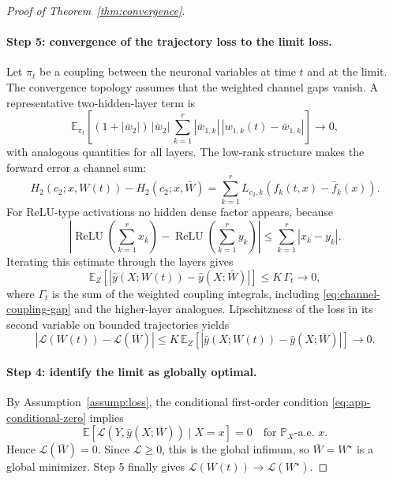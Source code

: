 \documentclass{article}
\newcommand{\E}{\mathbb{E}}
\newcommand{\Pp}{\mathbb{P}}
\newcommand{\calL}{\mathcal{L}}
\newcommand{\scrL}{\mathcal{L}}
\begin{document}
\begin{proof}[Proof of Theorem~\ref{thm:convergence}]
\paragraph{Step 5: convergence of the trajectory loss to the limit loss.}
Let $\pi_t$ be a coupling between the neuronal variables at time $t$ and at the limit. The convergence topology assumes that the weighted channel gaps vanish. A representative two-hidden-layer term is
\begin{equation}
\E_{\pi_t}\!\left[
(1+|\bar w_2|)\,|\bar w_2|\,
\sum_{k=1}^{r}|\bar w_{1,k}|\,|w_{1,k}(t)-\bar w_{1,k}|
\right]\longrightarrow0,
\label{eq:channel-coupling-gap}
\end{equation}
with analogous quantities for all layers. The low-rank structure makes the forward error a channel sum:
\begin{equation}
H_2(c_2;x,W(t))-H_2(c_2;x,\bar W)
=
\sum_{k=1}^r L_{c_2,k}
\left(f_k(t,x)-\bar f_k(x)\right).
\end{equation}
For ReLU-type activations no hidden dense factor appears, because
\begin{equation}
\left|
\operatorname{ReLU}\!\left(\sum_{k=1}^r x_k\right)
-
\operatorname{ReLU}\!\left(\sum_{k=1}^r y_k\right)
\right|
\le
\sum_{k=1}^r |x_k-y_k|.
\end{equation}
Iterating this estimate through the layers gives
\begin{equation}
\E_Z\!\left[
|\hat y(X;W(t))-\hat y(X;\bar W)|
\right]\le K\,\Gamma_t\longrightarrow0,
\label{eq:output-coupling-gap}
\end{equation}
where $\Gamma_t$ is the sum of the weighted coupling integrals, including \eqref{eq:channel-coupling-gap} and the higher-layer analogues. Lipschitzness of the loss in its second variable on bounded trajectories yields
\begin{equation}
|\scrL(W(t))-\scrL(\bar W)|
\le
K\,\E_Z\!\left[
|\hat y(X;W(t))-\hat y(X;\bar W)|
\right]\longrightarrow0.
\end{equation}

\paragraph{Step 4: identify the limit as globally optimal.}
By Assumption~\ref{assump:loss}, the conditional first-order condition \eqref{eq:app-conditional-zero} implies
\begin{equation}
\E[\calL(Y,\hat y(X;\bar W))\mid X=x]=0
\quad\text{for }\Pp_X\text{-a.e. }x.
\end{equation}
Hence $\scrL(\bar W)=0$. Since $\calL\ge0$, this is the global infimum, so $\bar W=W^\star$ is a global minimizer. Step 5 finally gives $\scrL(W(t))\to\scrL(W^\star)$.
\end{proof}
\end{document}
